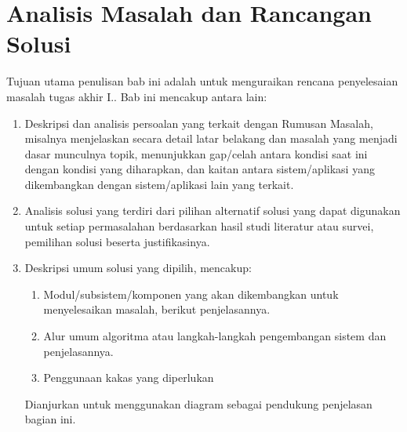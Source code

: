 
\chapter{Analisis Masalah dan Rancangan Solusi}

Tujuan utama penulisan bab ini adalah untuk menguraikan rencana penyelesaian masalah tugas akhir I.. Bab ini mencakup antara lain: 

\begin{enumerate}
    \item Deskripsi dan analisis persoalan yang terkait dengan Rumusan Masalah, misalnya menjelaskan secara detail latar belakang dan masalah yang menjadi dasar munculnya topik, menunjukkan gap/celah antara kondisi saat ini dengan kondisi yang diharapkan, dan kaitan antara sistem/aplikasi yang dikembangkan dengan sistem/aplikasi lain yang terkait.
    \item Analisis solusi yang terdiri dari pilihan alternatif solusi yang dapat digunakan untuk setiap permasalahan berdasarkan hasil studi literatur atau survei, pemilihan solusi beserta justifikasinya.
    \item Deskripsi umum solusi yang dipilih, mencakup:
        \begin{enumerate} 
            \renewcommand{\labelenumii}{\alph{enumii}.}
            \item Modul/subsistem/komponen yang akan dikembangkan untuk menyelesaikan masalah, berikut penjelasannya.
            \item Alur umum algoritma atau langkah-langkah pengembangan sistem dan penjelasannya.
            \item Penggunaan kakas yang diperlukan
        \end{enumerate}
    Dianjurkan untuk menggunakan diagram sebagai pendukung penjelasan bagian ini.
\end{enumerate}
